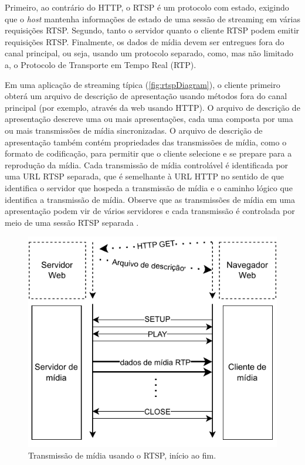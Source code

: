\documentclass[12pt, %
openright, 
oneside, %
a4paper,    %
brazil]{facom-ufu-abntex2}
\begin{document}
Primeiro, ao contrário do HTTP, o RTSP é um protocolo com estado, exigindo que
o \textit{host} mantenha informações de estado de uma sessão de streaming em
várias requisições RTSP. Segundo, tanto o servidor quanto o cliente RTSP podem
emitir requisições RTSP. Finalmente, os dados de mídia devem ser entregues fora
do canal principal, ou seja, usando um protocolo separado, como, mas não
limitado a, o Protocolo de Transporte em Tempo Real (RTP).

Em uma aplicação de streaming típica (\autoref{fig:rtspDiagram}), o cliente
primeiro obterá um arquivo de descrição de apresentação usando métodos fora do
canal principal (por exemplo, através da web usando HTTP). O arquivo de
descrição de apresentação descreve uma ou mais apresentações, cada uma composta
por uma ou mais transmissões de mídia sincronizadas. O arquivo de descrição de
apresentação também contém propriedades das transmissões de mídia, como o
formato de codificação, para permitir que o cliente selecione e se prepare para
a reprodução da mídia. Cada transmissão de mídia controlável é identificada por
uma URL RTSP separada, que é semelhante à URL HTTP no sentido de que identifica
o servidor que hospeda a transmissão de mídia e o caminho lógico que identifica
a transmissão de mídia. Observe que as transmissões de mídia em uma
apresentação podem vir de vários servidores e cada transmissão é controlada por
meio de uma sessão RTSP separada \cite{rfc2326}.

\begin{figure}[!ht]
	\centering
	\includegraphics[width=0.8\linewidth]{rtsp.pdf}
	\caption[Diagrama RTSP]{Transmissão de mídia usando o RTSP, início ao
		fim.}
	\label{fig:rtspDiagram}
\end{figure}
\end{document}
